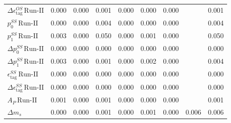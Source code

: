 \begin{tabular}{l  c  c  c  c  c  c  c  | c }
$\Delta \epsilon_{\text{tag}}^{OS} \, \text{Run-II}$ & 0.000 & 0.000 & 0.001 & 0.000 & 0.000 & 0.000 &  & 0.001 \\ 
$p_{0}^{SS} \, \text{Run-II}$ & 0.000 & 0.000 & 0.004 & 0.000 & 0.000 & 0.000 &  & 0.004 \\ 
$p_{1}^{SS} \, \text{Run-II}$ & 0.003 & 0.000 & 0.050 & 0.000 & 0.001 & 0.000 &  & 0.050 \\ 
$\Delta p_{0}^{SS} \, \text{Run-II}$ & 0.000 & 0.000 & 0.000 & 0.000 & 0.000 & 0.000 &  & 0.000 \\ 
$\Delta p_{1}^{SS} \, \text{Run-II}$ & 0.003 & 0.000 & 0.001 & 0.000 & 0.002 & 0.000 &  & 0.004 \\ 
$\epsilon_{\text{tag}}^{SS} \, \text{Run-II}$ & 0.000 & 0.000 & 0.000 & 0.000 & 0.000 & 0.000 &  & 0.000 \\ 
$\Delta \epsilon_{\text{tag}}^{SS} \, \text{Run-II}$ & 0.000 & 0.000 & 0.000 & 0.000 & 0.000 & 0.000 &  & 0.000 \\ 
$A_{P} \, \text{Run-II}$ & 0.001 & 0.000 & 0.001 & 0.000 & 0.000 & 0.000 &  & 0.001 \\ 
$\Delta m_{s}$ & 0.000 & 0.000 & 0.001 & 0.000 & 0.001 & 0.000 & 0.006 & 0.006 \\ 
\hline
\hline
\end{tabular}
